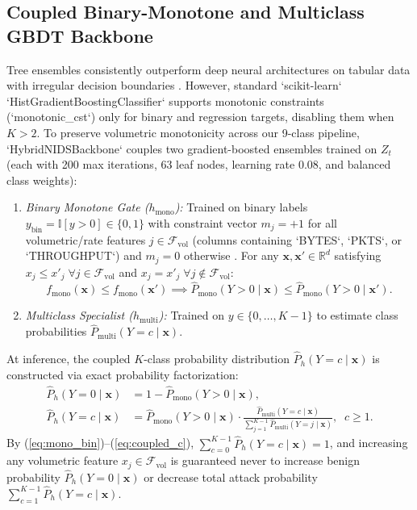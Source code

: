 ﻿\documentclass[conference]{IEEEtran}
\begin{document}
\subsection{Coupled Binary-Monotone and Multiclass GBDT Backbone}
Tree ensembles consistently outperform deep neural architectures on tabular data with irregular decision boundaries \cite{b14}. However, standard `scikit-learn` `HistGradientBoostingClassifier` supports monotonic constraints (`monotonic_cst`) only for binary and regression targets, disabling them when $K > 2$. To preserve volumetric monotonicity across our 9-class pipeline, `HybridNIDSBackbone` couples two gradient-boosted ensembles trained on $Z_t$ (each with 200 max iterations, 63 leaf nodes, learning rate $0.08$, and balanced class weights):
\begin{enumerate}
    \item \textit{Binary Monotone Gate ($h_{\text{mono}}$):} Trained on binary labels $y_{\text{bin}} = \mathbb{I}[y > 0] \in \{0, 1\}$ with constraint vector $m_j = +1$ for all volumetric/rate features $j \in \mathcal{F}_{\text{vol}}$ (columns containing `BYTES`, `PKTS`, or `THROUGHPUT`) and $m_j = 0$ otherwise \cite{b15}. For any $\mathbf{x}, \mathbf{x}' \in \mathbb{R}^d$ satisfying $x_j \le x'_j \; \forall j \in \mathcal{F}_{\text{vol}}$ and $x_j = x'_j \; \forall j \notin \mathcal{F}_{\text{vol}}$:
    \begin{equation}
    f_{\text{mono}}(\mathbf{x}) \le f_{\text{mono}}(\mathbf{x}') \implies \hat{P}_{\text{mono}}(Y > 0 \mid \mathbf{x}) \le \hat{P}_{\text{mono}}(Y > 0 \mid \mathbf{x}').
    \label{eq:mono_bin}
    \end{equation}
    \item \textit{Multiclass Specialist ($h_{\text{multi}}$):} Trained on $y \in \{0, \dots, K-1\}$ to estimate class probabilities $\hat{P}_{\text{multi}}(Y = c \mid \mathbf{x})$.
\end{enumerate}
At inference, the coupled $K$-class probability distribution $\hat{P}_h(Y = c \mid \mathbf{x})$ is constructed via exact probability factorization:
\begin{align}
\hat{P}_h(Y = 0 \mid \mathbf{x}) &= 1 - \hat{P}_{\text{mono}}(Y > 0 \mid \mathbf{x}), \label{eq:coupled_0} \\
\hat{P}_h(Y = c \mid \mathbf{x}) &= \hat{P}_{\text{mono}}(Y > 0 \mid \mathbf{x}) \cdot \frac{\hat{P}_{\text{multi}}(Y = c \mid \mathbf{x})}{\sum_{j=1}^{K-1} \hat{P}_{\text{multi}}(Y = j \mid \mathbf{x})}, \;\; c \ge 1.
\label{eq:coupled_c}
\end{align}
By (\ref{eq:mono_bin})--(\ref{eq:coupled_c}), $\sum_{c=0}^{K-1} \hat{P}_h(Y = c \mid \mathbf{x}) = 1$, and increasing any volumetric feature $x_j \in \mathcal{F}_{\text{vol}}$ is guaranteed never to increase benign probability $\hat{P}_h(Y = 0 \mid \mathbf{x})$ or decrease total attack probability $\sum_{c=1}^{K-1} \hat{P}_h(Y = c \mid \mathbf{x})$.
\end{document}
